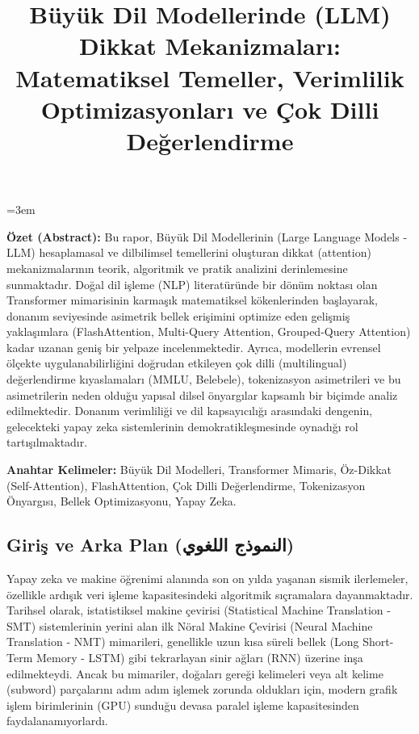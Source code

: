 \documentclass[11pt,a4paper]{article}
\begin{document}
\emergencystretch=3em

\title{Büyük Dil Modellerinde (LLM) Dikkat Mekanizmaları: Matematiksel Temeller, Verimlilik Optimizasyonları ve Çok Dilli Değerlendirme}
\author{}
\date{}
\maketitle

\tableofcontents
\newpage

\textbf{Özet (Abstract):} Bu rapor, Büyük Dil Modellerinin (Large Language Models - LLM) hesaplamasal ve dilbilimsel temellerini oluşturan dikkat (attention) mekanizmalarının teorik, algoritmik ve pratik analizini derinlemesine sunmaktadır. Doğal dil işleme (NLP) literatüründe bir dönüm noktası olan Transformer mimarisinin karmaşık matematiksel kökenlerinden başlayarak, donanım seviyesinde asimetrik bellek erişimini optimize eden gelişmiş yaklaşımlara (FlashAttention, Multi-Query Attention, Grouped-Query Attention) kadar uzanan geniş bir yelpaze incelenmektedir. Ayrıca, modellerin evrensel ölçekte uygulanabilirliğini doğrudan etkileyen çok dilli (multilingual) değerlendirme kıyaslamaları (MMLU, Belebele), tokenizasyon asimetrileri ve bu asimetrilerin neden olduğu yapısal dilsel önyargılar kapsamlı bir biçimde analiz edilmektedir. Donanım verimliliği ve dil kapsayıcılığı arasındaki dengenin, gelecekteki yapay zeka sistemlerinin demokratikleşmesinde oynadığı rol tartışılmaktadır.

\textbf{Anahtar Kelimeler:} Büyük Dil Modelleri, Transformer Mimaris, Öz-Dikkat (Self-Attention), FlashAttention, Çok Dilli Değerlendirme, Tokenizasyon Önyargısı, Bellek Optimizasyonu, Yapay Zeka.

\subsection{Giriş ve Arka Plan (النموذج اللغوي)}
Yapay zeka ve makine öğrenimi alanında son on yılda yaşanan sismik ilerlemeler, özellikle ardışık veri işleme kapasitesindeki algoritmik sıçramalara dayanmaktadır. Tarihsel olarak, istatistiksel makine çevirisi (Statistical Machine Translation - SMT) sistemlerinin yerini alan ilk Nöral Makine Çevirisi (Neural Machine Translation - NMT) mimarileri, genellikle uzun kısa süreli bellek (Long Short-Term Memory - LSTM) gibi tekrarlayan sinir ağları (RNN) üzerine inşa edilmekteydi. Ancak bu mimariler, doğaları gereği kelimeleri veya alt kelime (subword) parçalarını adım adım işlemek zorunda oldukları için, modern grafik işlem birimlerinin (GPU) sunduğu devasa paralel işleme kapasitesinden faydalanamıyorlardı.
\end{document}
